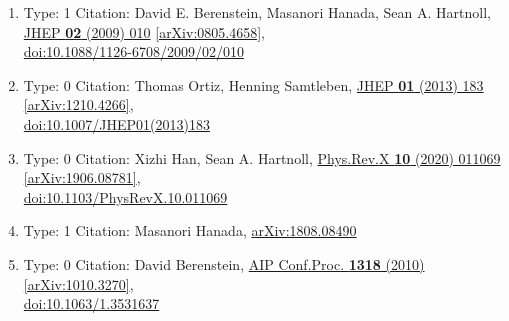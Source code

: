 \documentclass[a4paper,10pt]{article}
\begin{document}
\begin{enumerate}
\begin{enumerate}
  \item Type: 1 Citation: David E. Berenstein, Masanori Hanada, Sean A. Hartnoll, \href{https://www.doi.org/10.1088/1126-6708/2009/02/010}{JHEP {\bf 02} (2009) 010}  \href{https://arxiv.org/abs/0805.4658}{[arXiv:0805.4658]},\\\href{https://www.doi.org/10.1088/1126-6708/2009/02/010}{doi:10.1088/1126-6708/2009/02/010}
  \item Type: 0 Citation: Thomas Ortiz, Henning Samtleben, \href{https://www.doi.org/10.1007/JHEP01(2013)183}{JHEP {\bf 01} (2013) 183}  \href{https://arxiv.org/abs/1210.4266}{[arXiv:1210.4266]},\\\href{https://www.doi.org/10.1007/JHEP01(2013)183}{doi:10.1007/JHEP01(2013)183}
  \item Type: 0 Citation: Xizhi Han, Sean A. Hartnoll, \href{https://www.doi.org/10.1103/PhysRevX.10.011069}{Phys.Rev.X {\bf 10} (2020) 011069}  \href{https://arxiv.org/abs/1906.08781}{[arXiv:1906.08781]},\\\href{https://www.doi.org/10.1103/PhysRevX.10.011069}{doi:10.1103/PhysRevX.10.011069}
  \item Type: 1 Citation: Masanori Hanada, \href{https://arxiv.org/abs/1808.08490}{arXiv:1808.08490}
  \item Type: 0 Citation: David Berenstein, \href{https://www.doi.org/10.1063/1.3531637}{AIP Conf.Proc. {\bf 1318} (2010) }  \href{https://arxiv.org/abs/1010.3270}{[arXiv:1010.3270]},\\\href{https://www.doi.org/10.1063/1.3531637}{doi:10.1063/1.3531637}

\end{enumerate}
\end{enumerate}
\end{document}
